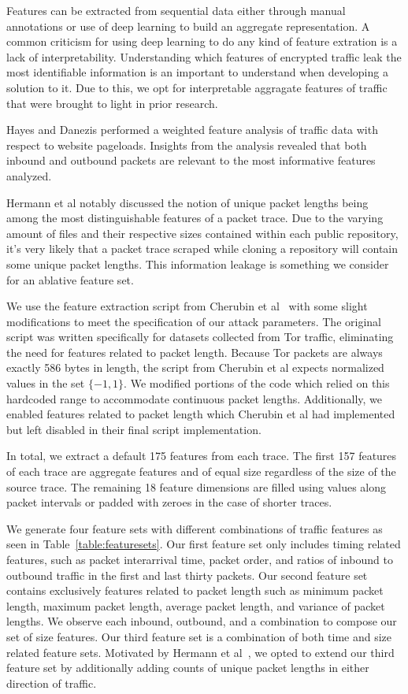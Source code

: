 \documentclass[sigconf,authorversion,nonacm]{acmart}
\begin{document}
Features can be extracted from sequential data either through manual annotations or use of deep learning to build an aggregate representation. A common criticism for using deep learning to do any kind of feature extration is a lack of interpretability. Understanding which features of encrypted traffic leak the most identifiable information is an important to understand when developing a solution to it. Due to this, we opt for interpretable aggragate features of traffic that were brought to light in prior research.

Hayes and Danezis\citep{hayes2016k} performed a weighted feature analysis of traffic data with respect to website pageloads. Insights from the analysis revealed that both inbound and outbound packets are relevant to the most informative features analyzed.

Hermann et al \citep{herrmann2009website} notably discussed the notion of unique packet lengths being among the most distinguishable features of a packet trace. Due to the varying amount of files and their respective sizes contained within each public repository, it's very likely that a packet trace scraped while cloning a repository will contain some unique packet lengths. This information leakage is something we consider for an ablative feature set.

We use the feature extraction script from Cherubin et al~\citep{cherubin2017bayes} with some slight modifications to meet the specification of our attack parameters. The original script was written specifically for datasets collected from Tor traffic, eliminating the need for features related to packet length. Because Tor packets are always exactly 586 bytes in length, the script from Cherubin et al expects normalized values in the set $\{-1,1\}$. We modified portions of the code which relied on this hardcoded range to accommodate continuous packet lengths. Additionally, we enabled features related to packet length which Cherubin et al had implemented but left disabled in their final script implementation.

In total, we extract a default 175 features from each trace. The first 157 features of each trace are aggregate features and of equal size regardless of the size of the source trace. The remaining 18 feature dimensions are filled using values along packet intervals or padded with zeroes in the case of shorter traces.

We generate four feature sets with different combinations of traffic features as seen in Table~\ref{table:featuresets}. Our first feature set only includes timing related features, such as packet interarrival time, packet order, and ratios of inbound to outbound traffic in the first and last thirty packets. Our second feature set contains exclusively features related to packet length such as minimum packet length, maximum packet length, average packet length, and variance of packet lengths. We observe each inbound, outbound, and a combination to compose our set of size features. Our third feature set is a combination of both time and size related feature sets. Motivated by Hermann et al~\citep{herrmann2009website}, we opted to extend our third feature set by additionally adding counts of unique packet lengths in either direction of traffic.
\end{document}
